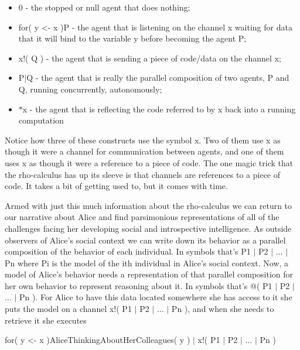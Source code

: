 \documentclass[runningheads]{llncs}
\begin{document}
\vspace{1\baselineskip}
\begin{itemize}
	\item 0 - the stopped or null agent that does nothing;

	\item for( y <- x )P - the agent that is listening on the channel x waiting for data that it will bind to the variable y before becoming the agent P;

	\item x!( Q ) - the agent that is sending a piece of code/data on the channel x;

	\item P$\vert$Q - the agent that is really the parallel composition of two agents, P and Q, running concurrently, autonomously;

	\item $\ast$x - the agent that is reflecting the code referred to by x back into a running computation

\end{itemize}
\vspace{1\baselineskip}
Notice how three of these constructs use the symbol x. Two of them use x as though it were a channel for communication between agents, and one of them uses x as though it were a reference to a piece of code. The one magic trick that the rho-calculus has up its sleeve is that channels are references to a piece of code. It takes a bit of getting used to, but it comes with time.

\vspace{1\baselineskip}
Armed with just this much information about the rho-calculus we can return to our narrative about Alice and find parsimonious representations of all of the challenges facing her developing social and introspective intelligence. As outside observers of Alice’s social context we can write down its behavior as a parallel composition of the behavior of each individual. In symbols that’s P1 $\vert$ P2 $\vert$ $\ldots$ $\vert$ Pn where Pi is the model of the ith individual in Alice’s social context. Now, a model of Alice’s behavior needs a representation of that parallel composition for her own behavior to represent reasoning about it. In symbols that’s @( P1 $\vert$ P2 $\vert$ $\ldots$ $\vert$ Pn ). For Alice to have this data located somewhere she has access to it she puts the model on a channel x!( P1 $\vert$ P2 $\vert$ $\ldots$ $\vert$ Pn ), and when she needs to retrieve it she executes

\vspace{1\baselineskip}
for( y <- x )AliceThinkingAboutHerColleagues( y ) $\vert$ x!( P1 $\vert$ P2 $\vert$ $\ldots$ $\vert$ Pn )
\end{document}
